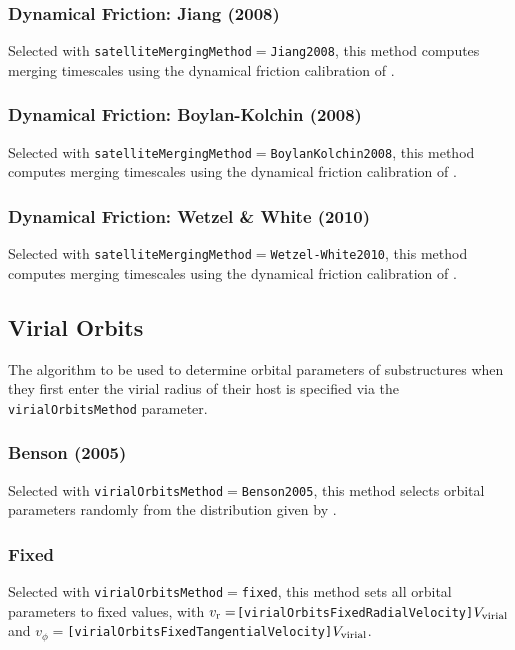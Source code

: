 \subsubsection{Dynamical Friction: Jiang (2008)}

Selected with {\tt satelliteMergingMethod}$=${\tt Jiang2008}, this method computes merging timescales using the dynamical friction calibration of \cite{jiang_fitting_2008}.

\subsubsection{Dynamical Friction: Boylan-Kolchin (2008)}

Selected with {\tt satelliteMergingMethod}$=${\tt BoylanKolchin2008}, this method computes merging timescales using the dynamical friction calibration of \cite{boylan-kolchin_dynamical_2008}.

\subsubsection{Dynamical Friction: Wetzel \& White (2010)}

Selected with {\tt satelliteMergingMethod}$=${\tt Wetzel-White2010}, this method computes merging timescales using the dynamical friction calibration of \cite{wetzel_what_2010}.

\subsection{Virial Orbits}

The algorithm to be used to determine orbital parameters of substructures when they first enter the virial radius of their host is specified via the {\tt virialOrbitsMethod} parameter.

\subsubsection{Benson (2005)}

Selected with {\tt virialOrbitsMethod}$=${\tt Benson2005}, this method selects orbital parameters randomly from the distribution given by \cite{benson_orbital_2005}.

\subsubsection{Fixed}

Selected with {\tt virialOrbitsMethod}$=${\tt fixed}, this method sets all orbital parameters to fixed values, with $v_{\rm r}=${\tt [virialOrbitsFixedRadialVelocity]}$V_{\rm virial}$ and  $v_\phi=${\tt [virialOrbitsFixedTangentialVelocity]}$V_{\rm virial}$.

